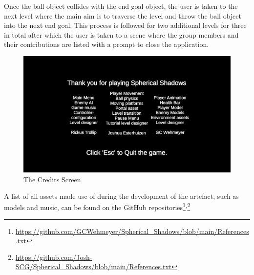 \noindent Once the ball object collides with the end goal object, the user is taken to the next level where the main aim is to traverse the level and throw the ball object into the next end goal. This process is followed for two additional levels for three in total after which the user is taken to a scene where the group members and their contributions are listed with a prompt to close the application.

\begin{figure}[H]
\centering
\centerline{\includegraphics[scale=0.25]{Figures/credits.png}}
\caption{The Credits Screen}
\end{figure}

\noindent A list of all assets made use of during the development of the artefact, such as models and music, can be found on the GitHub repositories\footnote{\url{https://github.com/GCWehmeyer/Spherical_Shadows/blob/main/References.txt}}$^{,}$\footnote{\url{https://github.com/Josh-SCG/Spherical_Shadows/blob/main/References.txt}} 
